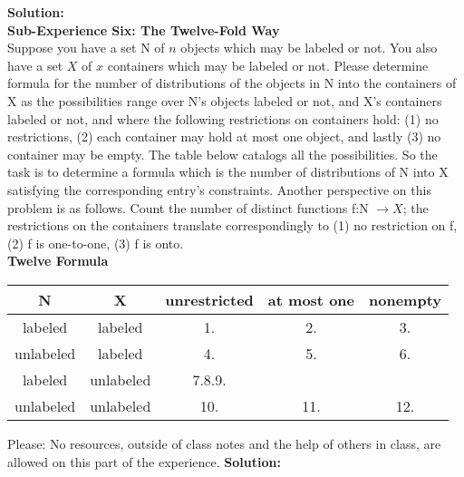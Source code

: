 \documentclass[10pt,a4paper]{report}
\begin{document}
	\textbf{Solution: }\\
	\newline
	\textbf{Sub-Experience Six: The Twelve-Fold Way}\\
	Suppose you have a set N of $n$ objects which may be labeled or not.  You also have a set $X$ of $x$ containers which may be labeled or not.  Please determine formula for the number of distributions of the objects in N into the containers of X as the possibilities range over N's objects labeled or not, and X's containers labeled or not, and where the following restrictions on containers hold:  (1) no restrictions,  (2) each container may hold at most one object, and lastly (3) no container may be empty.  The table below catalogs all the possibilities.  So the task is to determine a formula which is the number of distributions of N into X satisfying the corresponding entry's constraints.  Another perspective on this problem is as follows.  Count the number of distinct functions f:N $\rightarrow X$; the restrictions on the containers translate correspondingly to (1) no restriction on f, (2) f is one-to-one, (3) f is onto.\\
	\textbf{Twelve Formula}\\
	\begin{center}
		\begin{tabular}{c|c||c|c|c}
			\hline
			N&X&unrestricted&at most one&nonempty\\
			\hline
			labeled&labeled&1.&2.&3.\\
			unlabeled&labeled&4.&5.&6.\\
			labeled&unlabeled&7.8.9.\\
			unlabeled&unlabeled&10.&11.&12.\\
			\hline
			\end{tabular}
	\end{center}
	Please: No resources, outside of class notes and the help of others in class, are allowed on this part of the experience.
	\textbf{Solution: }\\
	\newline
\end{document}
